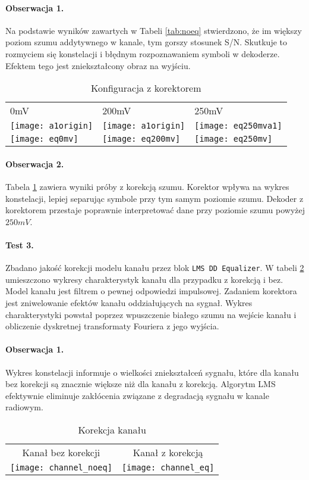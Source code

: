 \paragraph{Obserwacja 1.}
Na podstawie wyników zawartych w Tabeli \ref{tab:noeq} stwierdzono, że im większy poziom szumu addytywnego w kanale, tym gorszy stosunek S/N. 
Skutkuje to rozmyciem się konstelacji i błędnym rozpoznawaniem symboli w dekoderze.
Efektem tego jest zniekształcony obraz na wyjściu. 


\begin{table}[ht]
\centering
\caption{Konfiguracja z korektorem}
\label{tab:eq}
\begin{tabular}{|l|l|l|}
\hline
0mV      & 200mV    & 250mV    \\
\texttt{[image: a1origin]} & \texttt{[image: a1origin]} & \texttt{[image: eq250mva1]} \\
\texttt{[image: eq0mv]}   & \texttt{[image: eq200mv]}   & \texttt{[image: eq250mv]}  \\ \hline
\end{tabular}
\end{table}

\paragraph{Obserwacja 2.}
Tabela \ref{tab:eq} zawiera wyniki próby z korekcją szumu.
Korektor wpływa na wykres konstelacji, lepiej separując symbole przy tym samym poziomie szumu.
Dekoder z korektorem przestaje poprawnie interpretować dane przy poziomie szumu powyżej $250mV$.

\paragraph{Test 3.}
Zbadano jakość korekcji modelu kanału przez blok \texttt{LMS DD Equalizer}.
W tabeli \ref{channel_eq} umieszczono wykresy charakterystyk kanału dla przypadku z korekcją i bez.
Model kanału jest filtrem o pewnej odpowiedzi impulsowej.
Zadaniem korektora jest zniwelowanie efektów kanału oddziałujących na sygnał.
Wykres charakterystyki powstał poprzez wpuszczenie białego szumu na wejście kanału i obliczenie dyskretnej transformaty Fouriera z jego wyjścia.

\paragraph{Obserwacja 1.}
Wykres konstelacji informuje o wielkości zniekształceń sygnału, które dla kanału bez korekcji są znacznie większe niż dla kanału z korekcją.
Algorytm LMS efektywnie eliminuje zakłócenia związane z degradacją sygnału w kanale radiowym.


\begin{table}[ht]
\centering
\caption{Korekcja kanału}
\label{channel_eq}
\begin{tabular}{|c|c|}
\hline
Kanał bez korekcji & Kanał z korekcją \\
\texttt{[image: channel\_noeq]}      & \texttt{[image: channel\_eq]}      \\ \hline
\end{tabular}
\end{table}




